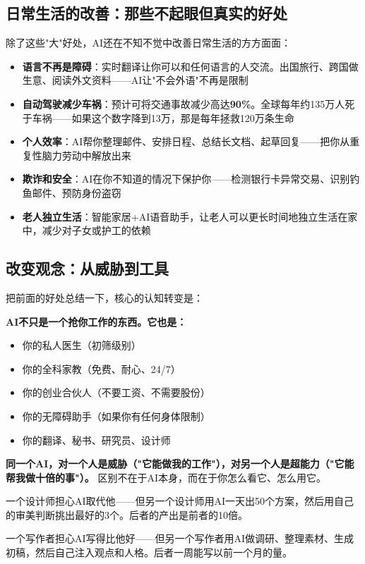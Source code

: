 \documentclass[a4paper,12pt,UTF8]{ctexart}
\begin{document}
\subsection{日常生活的改善：那些不起眼但真实的好处}

除了这些"大"好处，AI还在不知不觉中改善日常生活的方方面面：

\begin{itemize}
\item \textbf{语言不再是障碍}：实时翻译让你可以和任何语言的人交流。出国旅行、跨国做生意、阅读外文资料——AI让"不会外语"不再是限制
\item \textbf{自动驾驶减少车祸}：预计可将交通事故减少高达\textbf{90\%}。全球每年约135万人死于车祸——如果这个数字降到13万，那是每年拯救120万条生命
\item \textbf{个人效率}：AI帮你整理邮件、安排日程、总结长文档、起草回复——把你从重复性脑力劳动中解放出来
\item \textbf{欺诈和安全}：AI在你不知道的情况下保护你——检测银行卡异常交易、识别钓鱼邮件、预防身份盗窃
\item \textbf{老人独立生活}：智能家居+AI语音助手，让老人可以更长时间地独立生活在家中，减少对子女或护工的依赖
\end{itemize}

\subsection{改变观念：从威胁到工具}

把前面的好处总结一下，核心的认知转变是：

\textbf{AI不只是一个抢你工作的东西。它也是：}
\begin{itemize}
\item 你的私人医生（初筛级别）
\item 你的全科家教（免费、耐心、24/7）
\item 你的创业合伙人（不要工资、不需要股份）
\item 你的无障碍助手（如果你有任何身体限制）
\item 你的翻译、秘书、研究员、设计师
\end{itemize}

\textbf{同一个AI，对一个人是威胁（"它能做我的工作"），对另一个人是超能力（"它能帮我做十倍的事"）。} 区别不在于AI本身，而在于你怎么看它、怎么用它。

一个设计师担心AI取代他——但另一个设计师用AI一天出50个方案，然后用自己的审美判断挑出最好的3个。后者的产出是前者的10倍。

一个写作者担心AI写得比他好——但另一个写作者用AI做调研、整理素材、生成初稿，然后自己注入观点和人格。后者一周能写以前一个月的量。
\end{document}
